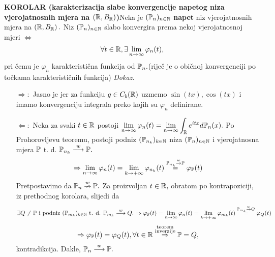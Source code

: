 \documentclass{article}
\begin{document}
\textbf{KOROLAR (karakterizacija slabe konvergencije napetog niza vjerojatnosnih mjera na \((\Bbb R,B_\Bbb R)\))}\newline  Neka je \((\Bbb P_n)_{n\in\Bbb N}\) \textbf{napet} niz vjerojatnosnih mjera na \(\left(\Bbb R,B_{\Bbb R}\right).\) Niz \((\Bbb P_n)_{n\in\Bbb N}\) slabo konvergira prema nekoj vjerojatnosnoj mjeri \(\Leftrightarrow\) \[\forall t\in\Bbb R,\exists\lim_{n\to\infty}\varphi_n(t),\] pri čemu je \(\varphi_n\) karakteristična funkcija od \(\Bbb P_n.\)\newline(riječ je o običnoj konvergenciji po točkama karakterističnih funkcija)\newline\newline
\textit{Dokaz.}
\begin{itemize}
    \item[\(\boxed{\Rightarrow}:\)] Jasno je jer za funkciju \(g\in C_b(\Bbb R)\) uzmemo \(\sin(tx),\cos(tx)\) i imamo konvergenciju integrala preko kojih su \(\varphi_n\) definirane. 
    \item[\(\boxed{\Leftarrow}:\)] Neka za svaki \(t\in\Bbb R\) postoji \(\displaystyle\lim_{n\to\infty}\varphi_n(t)=\lim_{n\to\infty}\int_{\Bbb R}e^{itx}d\Bbb P_n(x).\) Po Prohorovljevu teoremu, postoji podniz  \((\Bbb P_{n_k})_{k\in\Bbb N}\) niza \((\Bbb P_n)_{n\in\Bbb N}\) i vjerojatnosna mjera \(\Bbb P\) t. d. \(\Bbb P_{n_k}\overset{w}{\longrightarrow}\Bbb P.\) \[\Rightarrow\lim_{n\to\infty}\varphi_n(t)=\lim_{k\to+\infty}\varphi_{n_k}(t)\overset{\Bbb P_{n_k}\overset{w}{\to}\Bbb P}{=}\varphi_{\Bbb P}(t)\] Pretpostavimo da \(\Bbb P_n\overset{w}{\nrightarrow}\Bbb P.\) Za proizvoljan \(t\in\Bbb R,\) obratom po kontrapoziciji, iz prethodnog korolara, slijedi da \[\exists Q\ne\Bbb P\text{ i podniz }(\Bbb P_{m_k})_{k\in\Bbb N}\text{ t. d. }\Bbb P_{m_k}\overset{w}{\longrightarrow}Q.\Rightarrow\varphi_{\Bbb P}(t)=\lim_{n\to\infty}\varphi_n(t)=\lim_{k\to+\infty}\varphi_{m_k}(t)\overset{\Bbb P_{m_k}\overset{w}{\to}Q}{=}\varphi_Q(t)\] \[\Rightarrow\varphi_{\Bbb P}(t)=\varphi_Q(t),\forall t\in\Bbb R\overset{\substack{\text{teorem}\\\text{inverzije}}}{\Rightarrow}\Bbb P=Q,\] kontradikcija. Dakle, \(\Bbb P_n\overset{w}{\longrightarrow}\Bbb P.\)  
\end{itemize}
\newpage
\end{document}
